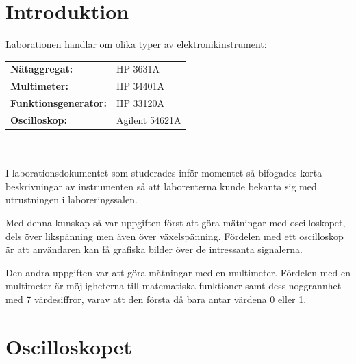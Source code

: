 \documentclass[11pt,a4paper]{article}
\begin{document}
\section{Introduktion}\label{setup}
Laborationen handlar om olika typer av elektronikinstrument:\\
\begin{tabular}{ll}
\rule{0pt}{3ex}\textbf{Nätaggregat:} & HP 3631A\\
\textbf{Multimeter:} & HP 34401A\\
\textbf{Funktionsgenerator:} & HP 33120A\\
\textbf{Oscilloskop:} & Agilent 54621A
\end{tabular}
\\
\\
I laborationsdokumentet som studerades inför momentet så bifogades korta
beskrivningar av instrumenten så att laborenterna kunde bekanta sig med 
utrustningen i laboreringssalen.\\
\par Med denna kunskap så var uppgiften först att göra mätningar med oscilloskopet, 
dels över likspänning men även över växelspänning. Fördelen med ett oscilloskop är 
att användaren kan få grafiska bilder över de intressanta signalerna. \par Den andra 
uppgiften var att göra mätningar med en multimeter. Fördelen med en multimeter är 
möjligheterna till matematiska funktioner samt dess noggrannhet med 7 värdesiffror, 
varav att den första då bara antar värdena 0 eller 1.
\section{Oscilloskopet}\label{}
\end{document}
